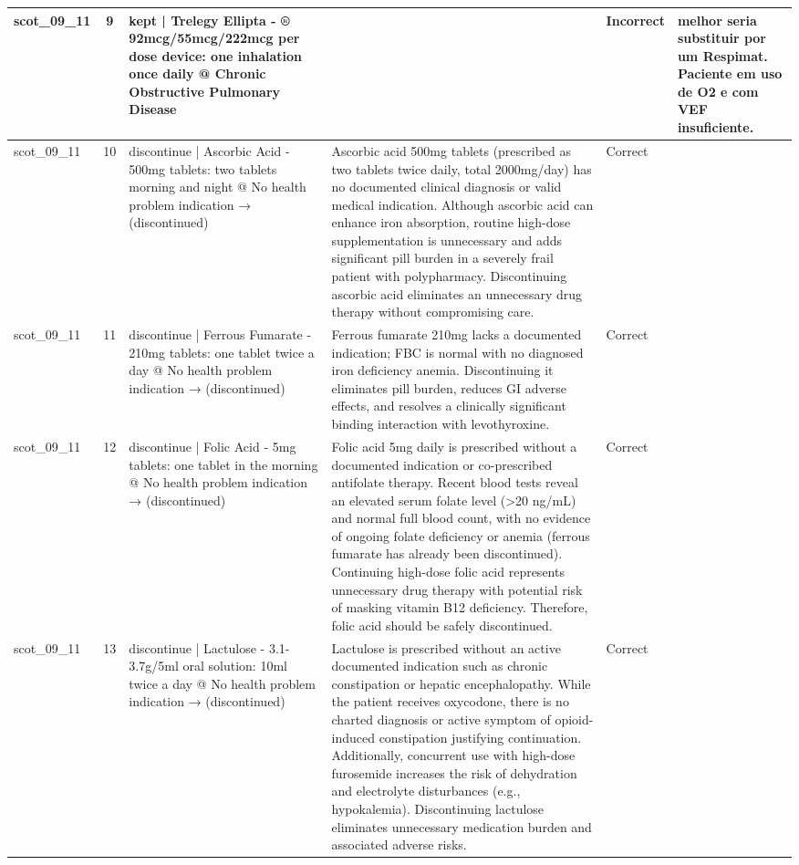 \begin{longtable}{|p{1.45cm}|c|p{3.3cm}|p{6.5cm}|p{1.55cm}|p{2.3cm}|}
scot\_09\_11 & 9 & kept | Trelegy Ellipta - ® 92mcg/55mcg/222mcg per dose device: one inhalation once daily @ Chronic Obstructive Pulmonary Disease &  & Incorrect & melhor seria substituir por um Respimat. Paciente em uso de O2 e com VEF insuficiente. \\
\hline
scot\_09\_11 & 10 & discontinue | Ascorbic Acid - 500mg tablets: two tablets morning and night @ No health problem indication → (discontinued) & Ascorbic acid 500mg tablets (prescribed as two tablets twice daily, total 2000mg/day) has no documented clinical diagnosis or valid medical indication. Although ascorbic acid can enhance iron absorption, routine high-dose supplementation is unnecessary and adds significant pill burden in a severely frail patient with polypharmacy. Discontinuing ascorbic acid eliminates an unnecessary drug therapy without compromising care. & Correct &  \\
\hline
scot\_09\_11 & 11 & discontinue | Ferrous Fumarate - 210mg tablets: one tablet twice a day @ No health problem indication → (discontinued) & Ferrous fumarate 210mg lacks a documented indication; FBC is normal with no diagnosed iron deficiency anemia. Discontinuing it eliminates pill burden, reduces GI adverse effects, and resolves a clinically significant binding interaction with levothyroxine. & Correct &  \\
\hline
scot\_09\_11 & 12 & discontinue | Folic Acid - 5mg tablets: one tablet in the morning @ No health problem indication → (discontinued) & Folic acid 5mg daily is prescribed without a documented indication or co-prescribed antifolate therapy. Recent blood tests reveal an elevated serum folate level (>20 ng/mL) and normal full blood count, with no evidence of ongoing folate deficiency or anemia (ferrous fumarate has already been discontinued). Continuing high-dose folic acid represents unnecessary drug therapy with potential risk of masking vitamin B12 deficiency. Therefore, folic acid should be safely discontinued. & Correct &  \\
\hline
scot\_09\_11 & 13 & discontinue | Lactulose - 3.1-3.7g/5ml oral solution: 10ml twice a day @ No health problem indication → (discontinued) & Lactulose is prescribed without an active documented indication such as chronic constipation or hepatic encephalopathy. While the patient receives oxycodone, there is no charted diagnosis or active symptom of opioid-induced constipation justifying continuation. Additionally, concurrent use with high-dose furosemide increases the risk of dehydration and electrolyte disturbances (e.g., hypokalemia). Discontinuing lactulose eliminates unnecessary medication burden and associated adverse risks. & Correct &  \\

\end{longtable}
